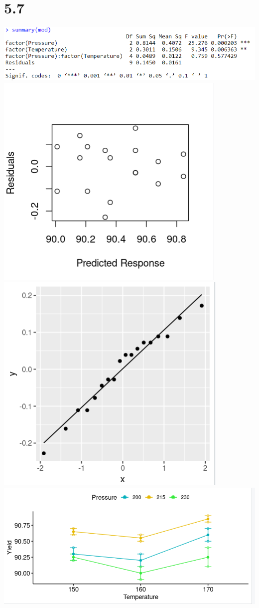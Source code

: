 \documentclass{article}
\begin{document}
\section*{5.7}
\includegraphics{5.7a.PNG}
\\\includegraphics{5.7bRes.PNG} \includegraphics{5.7bQQ.PNG}
\\\includegraphics{5.7c.PNG}
\end{document}
